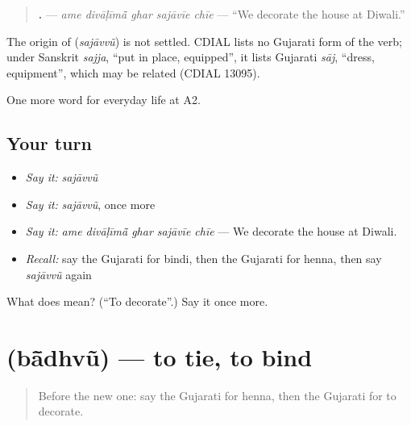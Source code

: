 \begin{quote}
\textbf{    .} — \emph{ame divāḷīmā̃ ghar sajāvīe chīe} — \textquotedblleft{}We decorate the house at Diwali.\textquotedblright{}
\end{quote}

\begin{cousinweb}
The origin of \textbf{} (\emph{sajāvvũ}) is not settled. CDIAL lists no Gujarati form of the verb; under Sanskrit \emph{sajja}, \textquotedblleft{}put in place, equipped\textquotedblright{}, it lists Gujarati \emph{sāj}, \textquotedblleft{}dress, equipment\textquotedblright{}, which may be related (CDIAL 13095).
\end{cousinweb}

\begin{grammarlens}[title={What you've built}]
One more word for everyday life at A2.
\end{grammarlens}

\subsection*{Your turn}
\begin{itemize}
\raggedright
  \item \emph{Say it:} \emph{sajāvvũ}
  \item \emph{Say it:} \emph{sajāvvũ}, once more
  \item \emph{Say it:} \emph{ame divāḷīmā̃ ghar sajāvīe chīe} — We decorate the house at Diwali.
  \item \emph{Recall:} say the Gujarati for bindi, then the Gujarati for henna, then say \emph{sajāvvũ} again
\end{itemize}

\begin{tcolorbox}[breakable,colback=teal!4,colframe=teal!35!black,title={Before you move on}]
What does  mean? (\textquotedblleft{}To decorate\textquotedblright{}.) Say it once more.
\end{tcolorbox}
\section[\texorpdfstring{\gu{બાંધવું} (bā̃dhvũ)}{બાંધવું (bā̃dhvũ)}]{ (bā̃dhvũ) — to tie, to bind}

\label{lesson:GU-C156-badhvu}



\begin{quote}
Before the new one: say the Gujarati for henna, then the Gujarati for to decorate.
\end{quote}

